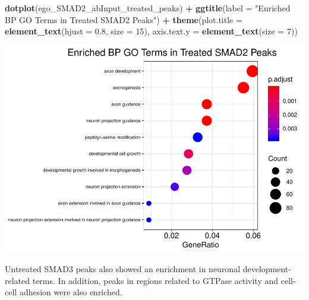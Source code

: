 \documentclass[]{article}
\newenvironment{Shaded}{\begin{snugshade}}{\end{snugshade}}
\newcommand{\DataTypeTok}[1]{\textcolor[rgb]{0.13,0.29,0.53}{#1}}
\newcommand{\DecValTok}[1]{\textcolor[rgb]{0.00,0.00,0.81}{#1}}
\newcommand{\FloatTok}[1]{\textcolor[rgb]{0.00,0.00,0.81}{#1}}
\newcommand{\KeywordTok}[1]{\textcolor[rgb]{0.13,0.29,0.53}{\textbf{#1}}}
\newcommand{\NormalTok}[1]{#1}
\newcommand{\OperatorTok}[1]{\textcolor[rgb]{0.81,0.36,0.00}{\textbf{#1}}}
\newcommand{\StringTok}[1]{\textcolor[rgb]{0.31,0.60,0.02}{#1}}
\begin{document}
\clearpage{}

\begin{Shaded}
\begin{Highlighting}[]
\KeywordTok{dotplot}\NormalTok{(ego_SMAD2_abInput_treated_peaks) }\OperatorTok{+}\StringTok{ }\KeywordTok{ggtitle}\NormalTok{(}\DataTypeTok{label =} \StringTok{"Enriched BP GO Terms in Treated SMAD2 Peaks"}\NormalTok{) }\OperatorTok{+}\StringTok{ }
\StringTok{    }\KeywordTok{theme}\NormalTok{(}\DataTypeTok{plot.title =} \KeywordTok{element_text}\NormalTok{(}\DataTypeTok{hjust =} \FloatTok{0.8}\NormalTok{, }\DataTypeTok{size =} \DecValTok{15}\NormalTok{), }\DataTypeTok{axis.text.y =} \KeywordTok{element_text}\NormalTok{(}\DataTypeTok{size =} \DecValTok{7}\NormalTok{))}
\end{Highlighting}
\end{Shaded}

\includegraphics{peak_annotation_go_term_analysis_files/figure-latex/unnamed-chunk-15-1.pdf}

\clearpage{}

Untreated SMAD3 peaks also showed an enrichment in neuronal
development-related terms. In addition, peaks in regions related to
GTPase activity and cell-cell adhesion were also enriched.
\end{document}
